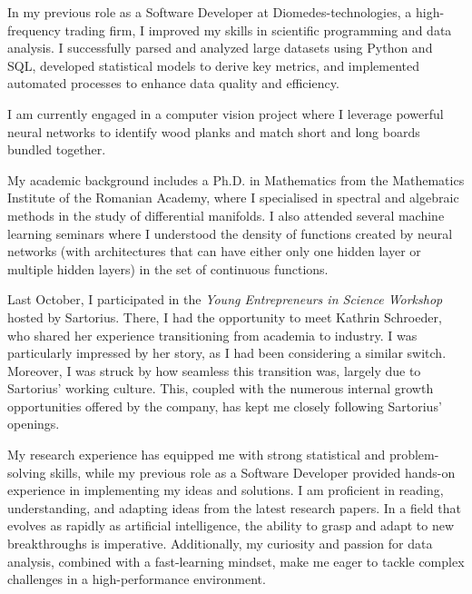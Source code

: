\documentclass[11pt, a4paper]{awesome-cv}
\begin{document}
\makecvheader[R]

\makecvfooter
  {}
  {}
  {}

\makelettertitle

\begin{cvletter}

In my previous role as a Software Developer at Diomedes-technologies, a high-frequency trading firm, I improved my skills in scientific programming and data analysis. I successfully parsed and analyzed large datasets using Python and SQL, developed statistical models to derive key metrics, and implemented automated processes to enhance data quality and efficiency.

I am currently engaged in a computer vision project where I leverage powerful neural networks to identify wood planks and match short and long boards bundled together.

My academic background includes a Ph.D. in Mathematics from the Mathematics Institute of the Romanian Academy, where I specialised in spectral and algebraic methods in the study of differential manifolds. I also attended several machine learning seminars where I understood the density of functions created by neural networks (with architectures that can have either only one hidden layer or multiple hidden layers) in the set of continuous functions.


Last October, I participated in the \emph{Young Entrepreneurs in Science Workshop} hosted by Sartorius. There, I had the opportunity to meet Kathrin Schroeder, who shared her experience transitioning from academia to industry. I was particularly impressed by her story, as I had been considering a similar switch. Moreover, I was struck by how seamless this transition was, largely due to Sartorius' working culture. This, coupled with the numerous internal growth opportunities offered by the company, has kept me closely following Sartorius' openings. 


My research experience has equipped me with strong statistical and problem-solving skills, while my previous role as a Software Developer provided hands-on experience in implementing my ideas and solutions. I am proficient in reading, understanding, and adapting ideas from the latest research papers. In a field that evolves as rapidly as artificial intelligence, the ability to grasp and adapt to new breakthroughs is imperative. Additionally, my curiosity and passion for data analysis, combined with a fast-learning mindset, make me eager to tackle complex challenges in a high-performance environment.

\end{cvletter}


\makeletterclosing
\end{document}
